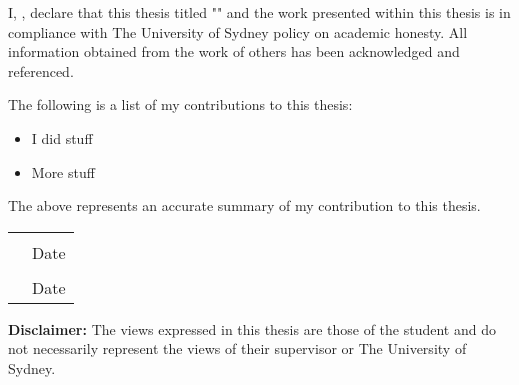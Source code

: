 
\begin{declaration}

I, \theauthor, declare that this thesis titled "\thetitle" and the work presented within this thesis is in compliance with The University of Sydney policy on academic honesty. All information obtained from the work of others has been acknowledged and referenced.

The following is a list of my contributions to this thesis:
\begin{itemize}
	\item I did stuff
	\item More stuff
\end{itemize}
The above represents an accurate summary of my contribution to this thesis. 

\vspace{1em}
\begin{tabular}{@{}p{}p{}@{}}
	\hrulefill & \hrulefill \\
	\theauthor & Date \\
	\hrulefill & \hrulefill \\
	\thesupervisor & Date \\
\end{tabular}
\vspace{1em}

\textbf{Disclaimer:} The views expressed in this thesis are those of the student and do not necessarily represent the views of their supervisor or The University of Sydney.

\end{declaration}

